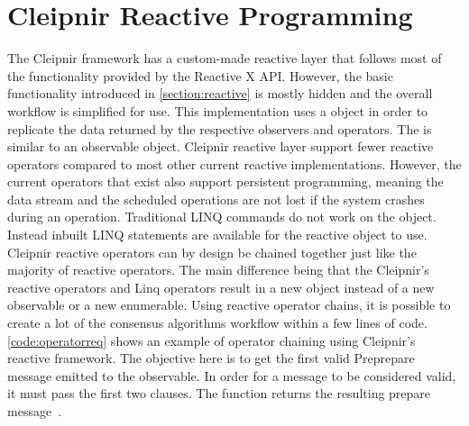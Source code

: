 \section{Cleipnir Reactive Programming}
The Cleipnir framework has a custom-made reactive layer that follows most of the functionality provided by the Reactive X API. However, the basic functionality introduced in \autoref{section:reactive} is mostly hidden and the overall workflow is simplified for use. This implementation uses a  object in order to replicate the data returned by the respective observers and operators. The  is similar to an observable object.
Cleipnir reactive layer support fewer reactive operators compared to most other current reactive implementations. However, the current operators that exist also support persistent programming, meaning the data stream and the scheduled operations are not lost if the system crashes during an operation. Traditional LINQ commands do not work on the  object. Instead inbuilt LINQ statements are available for the reactive  object to use. Cleipnir reactive operators can by design be chained together just like the majority of reactive operators. The main difference being that the Cleipnir's reactive operators and Linq operators result in a new  object instead of a new observable or a new enumerable. Using reactive operator chains, it is possible to create a lot of the consensus algorithms workflow within a few lines of code. \autoref{code:operatorreq} shows an example of operator chaining using Cleipnir’s reactive framework. The objective here is to get the first valid Preprepare message emitted to the observable. In order for a message to be considered valid, it must pass the first two  clauses. The  function returns the resulting prepare message~\cites[p.~6,8,13]{PAPER:PaxosCleipnir, WEB:ReactiveOperator}.


